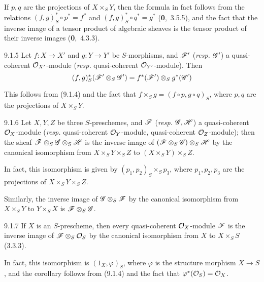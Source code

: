 \documentclass[../main.tex]{subfiles}
\begin{document}
If $p,q$ are the projections of $X\times_S Y$, then the formula in fact follows from the relations $(f,g)^*_S\circ p^*=f^*$ and $(f,g)^*_S\circ q^*=g^*$ (\textbf{0},~3.5.5), and the fact that the inverse image of a tensor product of algebraic sheaves is the tensor product of their inverse images (\textbf{0},~4.3.3).

\begin{cx}[Corollary]{9.1.5}
    Let $f\colon X\to X'$ and $g\colon Y\to Y'$ be $S$-morphisms, and $\mathscr{F}'$ (\emph{resp.} $\mathscr{G}'$) a quasi-coherent $\mathcal{O}_{X'}$-module (\emph{resp.} quasi-coherent $\mathcal{O}_{Y'}$-module).
    Then
    \begin{equation*}
        (f,g)^*_S(\mathscr{F}'\otimes_S\mathscr{G}') = f^*(\mathscr{F}')\otimes_S g^*(\mathscr{G}')
    \end{equation*}
\end{cx}

This follows from (9.1.4) and the fact that $f\times_S g=(f\circ p, g\circ q)_S$, where $p,q$ are the projections of $X\times_S Y$.

\begin{cx}[Corollary]{9.1.6}
    Let $X,Y,Z$ be three $S$-preschemes, and $\mathscr{F}$ (\emph{resp.} $\mathscr{G},\mathscr{H}$) a quasi-coherent $\mathcal{O}_X$-module (\emph{resp.} quasi-coherent $\mathcal{O}_Y$-module, quasi-coherent $\mathcal{O}_Z$-module); then the sheaf $\mathscr{F}\otimes_S\mathscr{G}\otimes_S\mathscr{H}$ is the inverse image of $(\mathscr{F}\otimes_S\mathscr{G})\otimes_S\mathscr{H}$ by the canonical isomorphism from $X\times_S Y\times_S Z$ to $(X\times_S Y)\times_S Z$.
\end{cx}

In fact, this isomorphism is given by $(p_1,p_2)_S\times_S p_3$, where $p_1,p_2,p_3$ are the projections of $X\times_S Y\times_S Z$.

Similarly, the inverse image of $\mathscr{G}\otimes_S\mathscr{F}$ by the canonical isomorphism from $X\times_S Y$ to $Y\times_S X$ is $\mathscr{F}\otimes_S\mathscr{G}$.

\begin{cx}[Corollary]{9.1.7}
    If $X$ is an $S$-prescheme, then every quasi-coherent $\mathcal{O}_X$-module $\mathscr{F}$ is the inverse image of $\mathscr{F}\otimes_S\mathcal{O}_S$ by the canonical isomorphism from $X$ to $X\times_S S$ (3.3.3).
\end{cx}

In fact, this isomorphism is $(1_X,\varphi)_S$, where $\varphi$ is the structure morphism $X\to S$, and the corollary follows from (9.1.4) and the fact that $\varphi^*(\mathcal{O}_S)=\mathcal{O}_X$.
\end{document}
